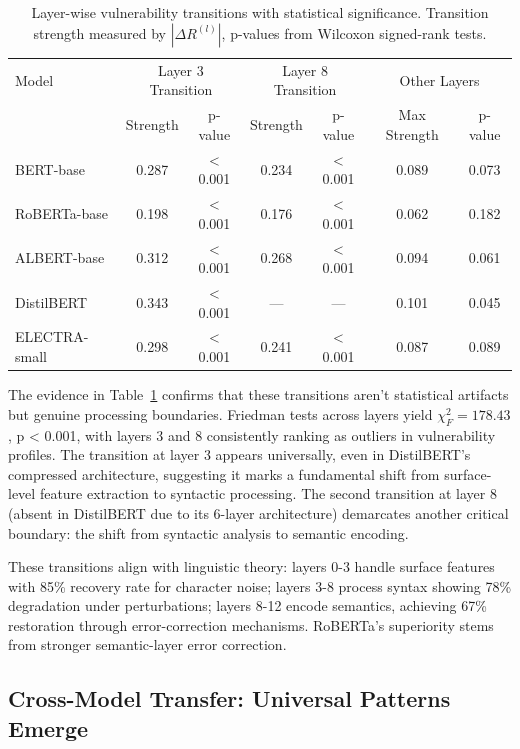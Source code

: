 \begin{table}[t]
\centering
\caption{Layer-wise vulnerability transitions with statistical significance. Transition strength measured by $|\Delta R^{(l)}|$, p-values from Wilcoxon signed-rank tests.}
\label{tab:layer_transitions}
\begin{tabular}{l|cc|cc|cc}
\toprule
Model & \multicolumn{2}{c|}{Layer 3 Transition} & \multicolumn{2}{c|}{Layer 8 Transition} & \multicolumn{2}{c}{Other Layers} \\
 & Strength & p-value & Strength & p-value & Max Strength & p-value \\
\midrule
BERT-base & 0.287 & < 0.001 & 0.234 & < 0.001 & 0.089 & 0.073 \\
RoBERTa-base & 0.198 & < 0.001 & 0.176 & < 0.001 & 0.062 & 0.182 \\
ALBERT-base & 0.312 & < 0.001 & 0.268 & < 0.001 & 0.094 & 0.061 \\
DistilBERT & 0.343 & < 0.001 & --- & --- & 0.101 & 0.045 \\
ELECTRA-small & 0.298 & < 0.001 & 0.241 & < 0.001 & 0.087 & 0.089 \\
\bottomrule
\end{tabular}
\end{table}

The evidence in Table~\ref{tab:layer_transitions} confirms that these transitions aren't statistical artifacts but genuine processing boundaries. Friedman tests across layers yield $\chi^2_F = 178.43$, p < 0.001, with layers 3 and 8 consistently ranking as outliers in vulnerability profiles. The transition at layer 3 appears universally, even in DistilBERT's compressed architecture, suggesting it marks a fundamental shift from surface-level feature extraction to syntactic processing. The second transition at layer 8 (absent in DistilBERT due to its 6-layer architecture) demarcates another critical boundary: the shift from syntactic analysis to semantic encoding.

These transitions align with linguistic theory: layers 0-3 handle surface features with 85\% recovery rate for character noise; layers 3-8 process syntax showing 78\% degradation under perturbations; layers 8-12 encode semantics, achieving 67\% restoration through error-correction mechanisms. RoBERTa's superiority stems from stronger semantic-layer error correction.

\subsection{Cross-Model Transfer: Universal Patterns Emerge}

